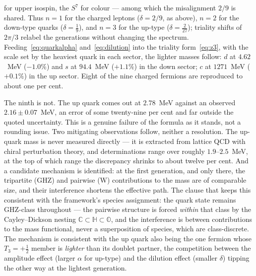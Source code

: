 for upper isospin, the $S^7$ for colour --- among which the misalignment $2/9$ is shared. Thus
$n = 1$ for the charged leptons ($\delta = 2/9$, as above), $n = 2$ for the down-type quarks
($\delta = \tfrac19$), and $n = 3$ for the up-type ($\delta = \tfrac{2}{27}$); triality shifts of
$2\pi/3$ relabel the generations without changing the spectrum.
Feeding~\eqref{eq:quarkalpha} and~\eqref{eq:dilution} into the triality form~\eqref{eq:z3}, with the
scale set by the heaviest quark in each sector, the lighter masses follow: $d$ at $4.62$~MeV
($-1.0\%$) and $s$ at $94.4$~MeV ($+1.1\%$) in the down sector; $c$ at $1271$~MeV ($+0.1\%$) in the
up sector. Eight of the nine charged fermions are reproduced to about one per cent.

The ninth is not. The up quark comes out at $2.78$~MeV against an observed $2.16 \pm 0.07$~MeV, an
error of some twenty-nine per cent and far outside the quoted uncertainty. This is a genuine failure
of the formula as it stands, not a rounding issue. Two mitigating
observations follow, neither a resolution. The up-quark mass is never measured directly --- it is
extracted from lattice QCD with chiral perturbation theory, and determinations range over roughly
$1.9$--$2.5$~MeV, at the top of which range the discrepancy shrinks to about twelve per cent. And a
candidate mechanism is identified: at the first generation, and only there, the tripartite (GHZ) and
pairwise (W) contributions to the mass are of comparable size, and their interference shortens the
effective path. The clause that keeps this consistent with the framework's species assignment: the
quark state remains GHZ-class throughout --- the pairwise structure is forced \emph{within} that
class by the Cayley--Dickson nesting $\mathbb{C} \subset \mathbb{H} \subset \mathbb{O}$, and
the interference is between contributions to the mass functional, never a superposition of
species, which are class-discrete. The mechanism is consistent with the up quark also being the
one fermion whose $T_3 = +\tfrac12$ member is \emph{lighter} than its doublet partner, the
competition between the amplitude effect (larger $\alpha$ for up-type) and the dilution effect
(smaller $\delta$) tipping the other way at the lightest generation.

